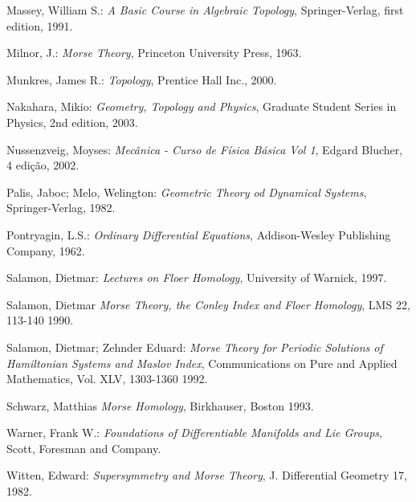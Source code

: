 \documentclass[12pt]{book}
\begin{document}
\begin{thebibliography}{9}
		Massey, William S.:
		\emph{A Basic Course in Algebraic Topology},
		Springer-Verlag, first edition,
		1991.
		
		Milnor, J.:
		\emph{Morse Theory},
		Princeton University Press, 1963.

		Munkres, James R.:
		\emph{Topology},
		Prentice Hall Inc., 2000.
				
		Nakahara, Mikio:
		\emph{Geometry, Topology and Physics},
		Graduate Student Series in Physics, 2nd edition,
		2003.
		
		Nussenzveig, Moyses:
		\emph{Mecânica - Curso de Física Básica Vol 1},
		Edgard Blucher, 4 edição,
		2002.
		
		Palis, Jaboc; Melo, Welington:
		\emph{Geometric Theory od Dynamical Systems},
		Springer-Verlag,
		1982.
		
		Pontryagin, L.S.:
		\emph{Ordinary Differential Equations},
		Addison-Wesley Publishing Company,
		1962.
		
		Salamon, Dietmar:
		\emph{Lectures on Floer Homology},
		University of Warnick,
		1997.


		Salamon, Dietmar
		\emph{Morse Theory, the Conley Index and Floer Homology},
		LMS 22, 113-140
		1990.

		Salamon, Dietmar; Zehnder Eduard:
		\emph{Morse Theory for Periodic Solutions of Hamiltonian Systems and Maslov Index},
		Communications on Pure and Applied Mathematics, Vol. XLV, 1303-1360
		1992.
		
		Schwarz, Matthias
		\emph{Morse Homology},
		Birkhauser, Boston
		1993.
		
		Warner, Frank W.:
		\emph{Foundations of Differentiable Manifolds and Lie Groups},
		Scott, Foresman and Company.
			
		Witten, Edward:
		\emph{Supersymmetry and Morse Theory},
		J. Differential Geometry 17,
		1982.
	\end{thebibliography}
	
\end{document}
